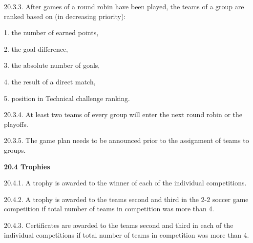 \documentclass[a4paper]{article}
\begin{document}
20.3.3. After games of a round robin have been played, the teams of a group are ranked based on (in decreasing
priority):

1. the number of earned points, 

2. the goal-difference,

3. the absolute number of goals, 

4. the result of a direct match,

5. position in Technical challenge ranking.

20.3.4. At least two teams of every group will enter the next round robin or the playoffs.

20.3.5. The game plan needs to be announced prior to the assignment of teams to groups.

\bigskip

\textbf{20.4 Trophies}

20.4.1. A trophy is awarded to the winner of each of the individual competitions.

20.4.2. A trophy is awarded to the teams second and third in the 2-2 soccer game competition if total number of teams in
competition was more than 4.

20.4.3. Certificates are awarded to the teams second and third in each of the individual competitions if total number of
teams in competition was more than 4.
\end{document}
